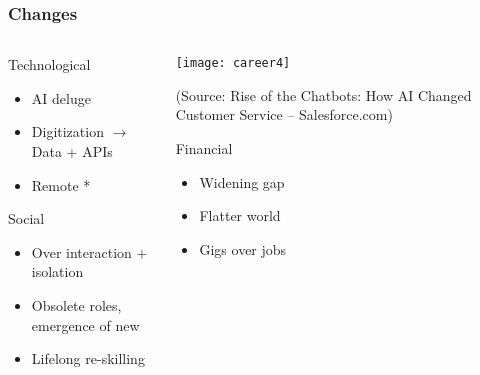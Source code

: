 \begin{frame}[fragile]\frametitle{Changes}
\begin{columns}
    \begin{column}[T]{0.5\linewidth}
			Technological
      \begin{itemize}
			\item AI deluge
			\item Digitization $\rightarrow$ Data + APIs
			\item Remote *
			\end{itemize}
			
			Social
      \begin{itemize}
			\item Over interaction + isolation
			\item Obsolete roles, emergence of new
			\item Lifelong re-skilling
			\end{itemize}			


    \end{column}
    \begin{column}[T]{0.5\linewidth}
\begin{center}
\texttt{[image: career4]}
\end{center}

{\tiny (Source: Rise of the Chatbots: How AI Changed Customer Service – Salesforce.com)}

		Financial
      \begin{itemize}
			\item Widening gap
			\item Flatter world
			\item Gigs over jobs
			\end{itemize}
    \end{column}
  \end{columns}
\end{frame}


	
